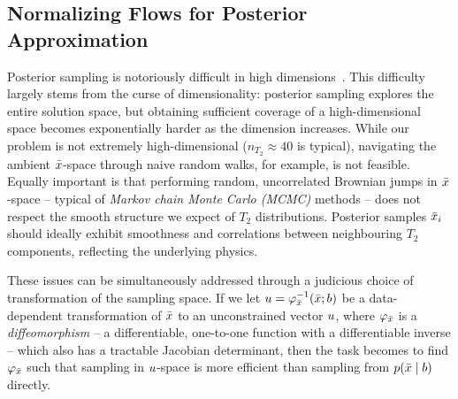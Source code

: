 \subsection{Normalizing Flows for Posterior Approximation}\label{subsec:normalizing_flows}

Posterior sampling is notoriously difficult in high dimensions~\citep{robert_monte_2004,neal_mcmc_2026}.
This difficulty largely stems from the curse of dimensionality: posterior sampling explores the entire solution space, but obtaining sufficient coverage of a high-dimensional space becomes exponentially harder as the dimension increases.
While our problem is not extremely high-dimensional ($n_{T_2} \approx 40$ is typical), navigating the ambient $\bar{x}$-space through naive random walks, for example, is not feasible.
Equally important is that performing random, uncorrelated Brownian jumps in $\bar{x}$-space -- typical of \textit{Markov chain Monte Carlo (\gls*{MCMC})} methods -- does not respect the smooth structure we expect of $T_2$ distributions.
Posterior samples $\bar{x}_{i}$ should ideally exhibit smoothness and correlations between neighbouring $T_2$ components, reflecting the underlying physics.

These issues can be simultaneously addressed through a judicious choice of transformation of the sampling space.
If we let $u = \varphi_{\bar{x}}^{-1}(\bar{x}; b)$ be a data-dependent transformation of $\bar{x}$ to an unconstrained vector $u$, where $\varphi_{\bar{x}}$ is a \textit{diffeomorphism} -- a differentiable, one-to-one function with a differentiable inverse -- which also has a tractable Jacobian determinant, then the task becomes to find $\varphi_{\bar{x}}$ such that sampling in $u$-space is more efficient than sampling from $p(\bar{x} \mid b)$ directly.

